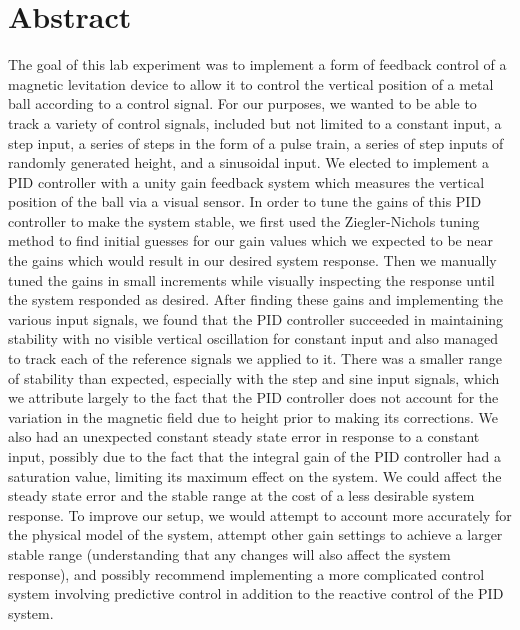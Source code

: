 \documentclass{article}
\begin{document}
\section{Abstract}
The goal of this lab experiment was to implement a form of feedback control of a magnetic levitation device to allow it to control the vertical position of a metal ball according to a control signal.  For our purposes, we wanted to be able to track a variety of control signals, included but not limited to a constant input, a step input, a series of steps in the form of a pulse train, a series of step inputs of randomly generated height, and a sinusoidal input.  We elected to implement a PID controller with a unity gain feedback system which measures the vertical position of the ball via a visual sensor.  In order to tune the gains of this PID controller to make the system stable, we first used the Ziegler-Nichols tuning method to find initial guesses for our gain values which we expected to be near the gains which would result in our desired system response.  Then we manually tuned the gains in small increments while visually inspecting the response until the system responded as desired.  After finding these gains and implementing the various input signals, we found that the PID controller succeeded in maintaining stability with no visible vertical oscillation for constant input and also managed to track each of the reference signals we applied to it.  There was a smaller range of stability than expected, especially with the step and sine input signals, which we attribute largely to the fact that the PID controller does not account for the variation in the magnetic field due to height prior to making its corrections.  We also had an unexpected constant steady state error in response to a constant input, possibly due to the fact that the integral gain of the PID controller had a saturation value, limiting its maximum effect on the system.  We could affect the steady state error and the stable range at the cost of a less desirable system response.  To improve our setup, we would attempt to account more accurately for the physical model of the system, attempt other gain settings to achieve a larger stable range (understanding that any changes will also affect the system response), and possibly recommend implementing a more complicated control system involving predictive control in addition to the reactive control of the PID system.\\
\end{document}
